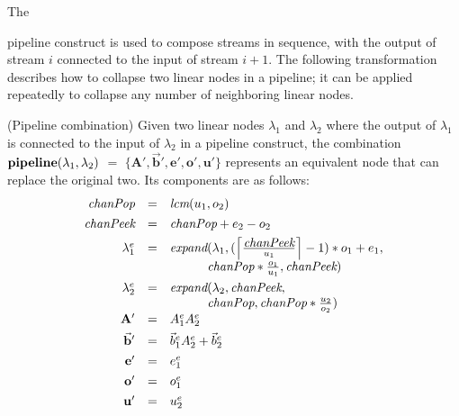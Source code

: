 The {pipeline construct is used to compose streams in sequence,
with the output of stream $i$ connected to the input of stream $i+1$.
The following transformation describes how to collapse two linear
nodes in a pipeline; it can be applied repeatedly to collapse
any number of neighboring linear nodes.

\begin{transformation} (Pipeline combination)
Given two linear nodes $\lambda_1$ and $\lambda_2$ where the output of
$\lambda_1$ is connected to the input of $\lambda_2$ in a pipeline
construct, the combination $\mbox{\bf pipeline}(\lambda_1, \lambda_2)$ $=$
$\{\mathbf{A}', \vec{\mathbf{b}}', \mathbf{e}', \mathbf{o}', \mathbf{u}'\}$ 
represents an equivalent node that
can replace the original two.  Its components are as follows:
\begin{equation} \nonumber
\begin{array}{rcl}
\mt{chanPop} & = & \mt{lcm}(u_1, o_2) \\ ~ \vspace{-8pt} \\
\mt{chanPeek} & = & \mt{chanPop} + e_2 - o_2 \\ ~ \vspace{-8pt} \\
\lambda_1^e & = & \mt{expand}(\lambda_1, (\left \lceil \frac{\mt{chanPeek}}{u_1} \right \rceil - 1) * o_1 + e_1, \\
~ & ~ & ~\hspace{0.32in}~ \mt{chanPop} * \frac{o_1}{u_1}, \mt{chanPeek}) \\ ~ \vspace{-8pt} \\
\lambda_2^e & = & \mt{expand}(\lambda_2, \mt{chanPeek}, \\
~ & ~ & ~\hspace{0.32in}~ \mt{chanPop}, \mt{chanPop} * \frac{u_2}{o_2}) \\
\mathbf{A'} & = & A_1^e A_2^e \\ ~ \vspace{-8pt} \\
\vec{\mathbf{b}}' & = & {\vec b}_1^e A_2^e + {\vec b}_2^e \\ ~ \vspace{-8pt} \\
\mathbf{e'} & = & e_1^e \\ ~ \vspace{-8pt} \\
\mathbf{o'} & = & o_1^e \\ ~ \vspace{-8pt} \\
\mathbf{u'} & = & u_2^e
\end{array}
\end{equation}
\end{transformation}

}
